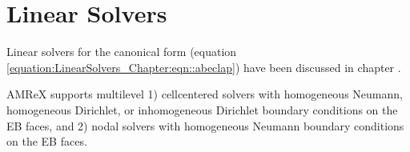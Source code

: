 \documentclass[letterpaper,10pt,english]{sphinxmanual}
\begin{document}
\begin{sphinxVerbatim}[commandchars=\\\{\}]
     

   

  

  
      
          
              
              
              
\end{sphinxVerbatim}


\section{Linear Solvers}
\label{\detokenize{EB:linear-solvers}}
\sphinxAtStartPar
Linear solvers for the canonical form (equation \eqref{equation:LinearSolvers_Chapter:eqn::abeclap})
have been discussed in chapter {\hyperref[\detokenize{LinearSolvers_Chapter:chap-linearsolvers}]{}}.

\sphinxAtStartPar
AMReX supports multi\sphinxhyphen{}level
1) cell\sphinxhyphen{}centered solvers with homogeneous Neumann, homogeneous Dirichlet,
or inhomogeneous Dirichlet boundary conditions on the EB faces, and
2) nodal solvers with homogeneous Neumann boundary conditions on the EB faces.
\end{document}

